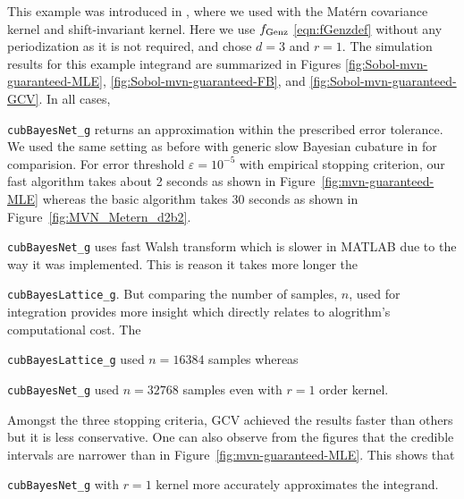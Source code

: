 \documentclass{svjour3}                     %
\newcommand{\code}[1]{\texttt{#1}}
\newcommand\figref{Figure~\ref}
\begin{document}
This example was introduced in \cite{JagHic19a}, where we used with the Mat\'ern covariance kernel and shift-invariant kernel. 
Here we use $ f_{\textup{Genz}}$ \eqref{eqn:fGenzdef} without any periodization as it is not required, and chose $d=3$ and $r=1$. The simulation results for this example integrand are summarized in Figures \ref{fig:Sobol-mvn-guaranteed-MLE}, \ref{fig:Sobol-mvn-guaranteed-FB}, and \ref{fig:Sobol-mvn-guaranteed-GCV}.  In all cases, {\code{cubBayesNet\_g} returns an approximation within the prescribed error tolerance. We used the same setting as before with generic slow Bayesian cubature in \cite{JagHic19a} for comparision. For error threshold $\varepsilon=10^{-5}$ with empirical stopping criterion, our fast algorithm takes about 2 seconds as shown in \figref{fig:mvn-guaranteed-MLE} whereas the basic algorithm takes 30 seconds as shown in \figref{fig:MVN_Metern_d2b2}. 
{\code{cubBayesNet\_g} uses fast Walsh transform which is slower in MATLAB due to the way it was implemented. This is reason it takes more longer the {\code{cubBayesLattice\_g}. 
But comparing the number of samples, $n$, used for integration provides more insight which directly relates to alogrithm's computational cost. The {\code{cubBayesLattice\_g} used $n=16384$ samples whereas {\code{cubBayesNet\_g} used $n=32768$ samples even with $r=1$ order kernel.

Amongst the three stopping criteria, GCV achieved the results faster than others but it is less conservative. 
One can also observe from the figures that the credible intervals are narrower than in \figref{fig:mvn-guaranteed-MLE}.
This shows that {\code{cubBayesNet\_g} with $r=1$ kernel more accurately approximates the integrand.

}}}}}}
\end{document}
